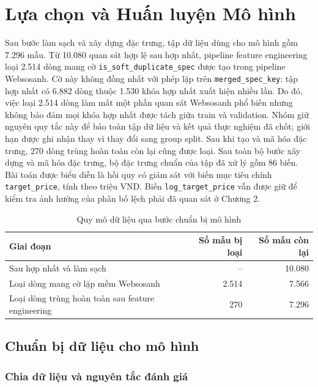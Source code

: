 \section{Lựa chọn và Huấn luyện Mô hình}
\label{sec:model-selection}

Sau bước làm sạch và xây dựng đặc trưng, tập dữ liệu dùng cho mô hình gồm 7.296 mẫu. Từ 10.080 quan sát hợp lệ sau hợp nhất, pipeline feature engineering loại 2.514 dòng mang cờ \texttt{is\_soft\_duplicate\_spec} được tạo trong pipeline Websosanh. Cờ này không đồng nhất với phép lặp trên \texttt{merged\_spec\_key}: tập hợp nhất có 6.882 dòng thuộc 1.530 khóa hợp nhất xuất hiện nhiều lần. Do đó, việc loại 2.514 dòng làm mất một phần quan sát Websosanh phổ biến nhưng không bảo đảm mọi khóa hợp nhất được tách giữa train và validation. Nhóm giữ nguyên quy tắc này để bảo toàn tập dữ liệu và kết quả thực nghiệm đã chốt; giới hạn được ghi nhận thay vì thay đổi sang group split. Sau khi tạo và mã hóa đặc trưng, 270 dòng trùng hoàn toàn còn lại cũng được loại. Sau toàn bộ bước xây dựng và mã hóa đặc trưng, bộ đặc trưng chuẩn của tập đã xử lý gồm 86 biến. Bài toán được biểu diễn là hồi quy có giám sát với biến mục tiêu chính \texttt{target\_price}, tính theo triệu VND. Biến \texttt{log\_target\_price} vẫn được giữ để kiểm tra ảnh hưởng của phân bố lệch phải đã quan sát ở Chương 2.

\begin{table}[H]
\centering
\caption{Quy mô dữ liệu qua bước chuẩn bị mô hình}
\label{tab:modeling-data-filter}
\begin{tabular}{lrr}
\toprule
Giai đoạn & Số mẫu bị loại & Số mẫu còn lại \\
\midrule
Sau hợp nhất và làm sạch & -- & 10.080 \\
Loại dòng mang cờ lặp mềm Websosanh & 2.514 & 7.566 \\
Loại dòng trùng hoàn toàn sau feature engineering & 270 & 7.296 \\
\bottomrule
\end{tabular}
\end{table}

\subsection{Chuẩn bị dữ liệu cho mô hình}

\subsubsection{Chia dữ liệu và nguyên tắc đánh giá}

